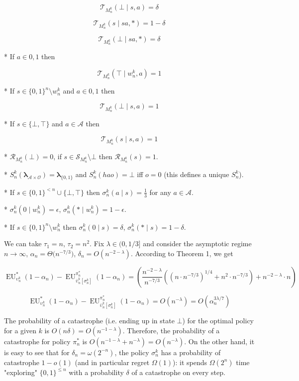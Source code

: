 \documentclass[a4paper]{article}
\newcommand{\Bool}{\{0,1\}}
\newcommand{\AP}[1]{\left(#1\right)}
\newcommand{\AB}[1]{\left[#1\right]}
\newcommand{\Estr}{\boldsymbol{\lambda}}
\newcommand{\Ob}{\mathcal{O}}
\newcommand{\A}{\mathcal{A}}
\newcommand{\St}{\mathcal{S}}
\newcommand{\T}{\mathcal{T}}
\newcommand{\R}{\mathcal{R}}
\newcommand{\EU}{\operatorname{EU}}
\begin{document}
$$\T_{M_n^k}(\bot \mid s,a) = \delta$$

$$\T_{M_n^k}(s \mid sa,*) = 1 - \delta$$

$$\T_{M_n^k}(\bot \mid sa,*) = \delta$$

* If $a \in {0,1}$ then

$$\T_{M_n^k}(\top \mid w_n^k,a) = 1$$

* If $s \in \Bool^n \setminus w_n^k$ and $a \in {0,1}$ then

$$\T_{M_n^k}(\bot \mid s,a) = 1$$

* If $s \in \{\bot,\top\}$ and $a \in \A$ then

$$\T_{M_n^k}(s \mid s,a) = 1$$

* $\R_{M_n^k}(\bot)=0$, if $s \in \St_{M_n^k} \setminus \bot$ then $\R_{M_n^k}(s)=1$.

* $S_n^k(\Estr_{\A \times \Ob})=\Estr_{\Bool}$ and $S_n^k(hao)=\bot$ iff $o = 0$ (this defines a unique $S_n^k$).

* If $s \in \Bool^{<n} \cup \{\bot,\top\}$ then $\sigma_n^k(a \mid s) = \frac{1}{3}$ for any $a \in \A$.

* $\sigma_n^k(0 \mid w_n^k) = \epsilon$, $\sigma_n^k(* \mid w_n^k) = 1 - \epsilon$.

* If $s \in \Bool^n \setminus w_n^k$ then $\sigma_n^k(0 \mid s) = \delta$, $\sigma_n^k(* \mid s) = 1 - \delta$.

We can take $\tau_1 = n$, $\tau_2 = n^2$. Fix $\lambda \in (0,1/3]$ and consider the asymptotic regime $n \rightarrow \infty$, $\alpha_n = \Theta\Big(n^{-7/3}\Big)$, $\delta_n = O\AP{n^{-2-\lambda}}$. According to Theorem 1, we get

$$\EU_{\upsilon_n^k}^*(1-\alpha_n) - \EU_{\bar{\upsilon}_n^k\AB{\sigma_n^k}}^{\pi_n^*}(1-\alpha_n) = \AP{\frac{n^{-2-\lambda}}{n^{-7/3}}\AP{\AP{n \cdot n^{-7/3}}^{1/4}+n^2 \cdot n^{-7/3}}+n^{-2-\lambda}\cdot n}$$

$$\EU_{\upsilon_n^k}^*(1-\alpha_n) - \EU_{\bar{\upsilon}_n^k\AB{\sigma_n^k}}^{\pi_n^*}(1-\alpha_n) = O\AP{n^{-\lambda}}=O\AP{\alpha_n^{3\lambda/7}}$$

The probability of a catastrophe (i.e. ending up in state $\bot$) for the optimal policy for a given $k$ is $O\AP{n\delta}=O\AP{n^{-1-\lambda}}$. Therefore, the probability of a catastrophe for policy $\pi_n^*$ is $O\AP{n^{-1-\lambda}+n^{-\lambda}}=O\AP{n^{-\lambda}}$. On the other hand, it is easy to see that for $\delta_n = \omega\AP{2^{-n}}$, the policy $\sigma_n^k$ has a probability of catastrophe $1-o(1)$ (and in particular  regret $\Omega(1)$): it spends $\Omega(2^n)$ time "exploring" $\Bool^{\leq n}$ with a probability $\delta$ of a catastrophe on every step.
\end{document}
